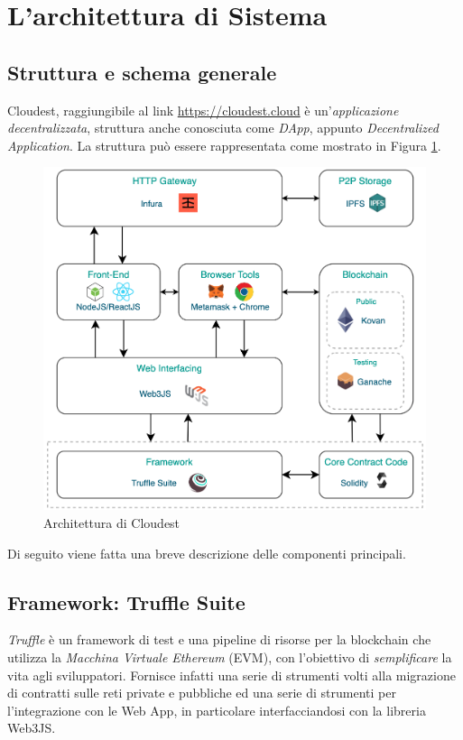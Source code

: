 \documentclass{article}
\begin{document}
\newpage
\section{L'architettura di Sistema}
\subsection{Struttura e schema generale}
Cloudest, raggiungibile al link \href{https://cloudest.cloud}{https://cloudest.cloud} è un'\textit{applicazione decentralizzata}, struttura anche conosciuta come \textit{DApp}, appunto \textit{Decentralized Application}. La struttura può essere rappresentata come mostrato in Figura \ref{fig:dapp_architecture.jpg}.
\\

\begin{figure}[!ht]
  \includegraphics[width=16cm]{images/dapp_architecture.png}
  \centering
  \caption{Architettura di Cloudest}
  \label{fig:dapp_architecture.jpg}
\end{figure}

Di seguito viene fatta una breve descrizione delle componenti principali.

\subsection{Framework: Truffle Suite}
\textit{Truffle} \cite{truffle_suite} è un framework di test e una pipeline di risorse per la blockchain che utilizza la \textit{Macchina Virtuale Ethereum} (EVM), con l'obiettivo di \textit{semplificare} la vita agli sviluppatori. Fornisce infatti una serie di strumenti volti alla migrazione di contratti sulle reti private e pubbliche ed una serie di strumenti per l'integrazione con le Web App, in particolare interfacciandosi con la libreria Web3JS.
\end{document}
